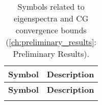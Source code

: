 \begin{longtable}{c p{10cm}}
    \caption{Symbols related to eigenspectra and CG convergence bounds (\cref{ch:preliminary_results}: Preliminary Results).}\label{tab:eigenspectra_symbols}                                     \\
    \hline
    \textbf{Symbol}          & \textbf{Description}                                                                                                                                               \\
    \hline
    \endfirsthead

    \hline
    \textbf{Symbol}          & \textbf{Description}                                                                                                                                               \\
    \hline
    \endhead

    \hline
    \endfoot

    \hline
    \endlastfoot


\end{longtable}

